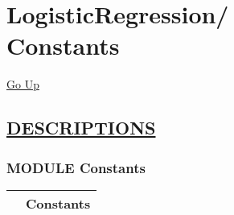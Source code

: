 \chapter*{\color{headfile}
{\large LogisticRegression\slash\hspace{0pt}}
 \\
Constants
}
\hypertarget{ecldoc:toc:LogisticRegression.Constants}{}
\hyperlink{ecldoc:toc:root/LogisticRegression}{Go Up}


\section*{\underline{\textsf{DESCRIPTIONS}}}
\subsection*{\textsf{\colorbox{headtoc}{\color{white} MODULE}
Constants}}

\hypertarget{ecldoc:LogisticRegression.Constants}{}

{\renewcommand{\arraystretch}{1.5}
\begin{tabularx}{\textwidth}{|>{\raggedright\arraybackslash}l|X|}
\hline
\hspace{0pt}\mytexttt{\color{red} } & \textbf{Constants} \\
\hline
\end{tabularx}
}

\par


